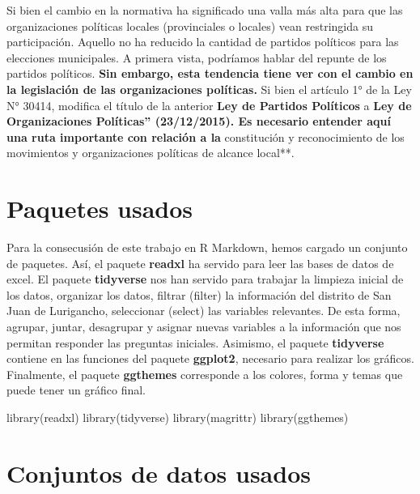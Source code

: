 \documentclass[
]{book}
\newenvironment{Shaded}{\begin{snugshade}}{\end{snugshade}}
\newcommand{\FunctionTok}[1]{\textcolor[rgb]{0.00,0.00,0.00}{#1}}
\newcommand{\NormalTok}[1]{#1}
\begin{document}
Si bien el cambio en la normativa ha significado una valla más alta para que las organizaciones políticas locales (provinciales o locales) vean restringida su participación. Aquello no ha reducido la cantidad de partidos políticos para las elecciones municipales. A primera vista, podríamos hablar del repunte de los partidos políticos. \textbf{Sin embargo, esta tendencia tiene ver con el cambio en la legislación de las organizaciones políticas.} Si bien el artículo 1° de la Ley N° 30414, modifica el título de la anterior \textbf{Ley de Partidos Políticos} a \textbf{Ley de Organizaciones Políticas'' (23/12/2015). Es necesario entender aquí una ruta importante con relación a la }constitución y reconocimiento de los movimientos
y organizaciones políticas de alcance local**.

\hypertarget{paquetes-usados-2}{%
\section{Paquetes usados}\label{paquetes-usados-2}}

Para la consecusión de este trabajo en R Markdown, hemos cargado un conjunto de paquetes. Así, el paquete \textbf{readxl} ha servido para leer las bases de datos de excel. El paquete \textbf{tidyverse} nos han servido para trabajar la limpieza inicial de los datos, organizar los datos, filtrar (filter) la información del distrito de San Juan de Lurigancho, seleccionar (select) las variables relevantes. De esta forma, agrupar, juntar, desagrupar y asignar nuevas variables a la información que nos permitan responder las preguntas iniciales. Asimismo, el paquete \textbf{tidyverse} contiene en las funciones del paquete \textbf{ggplot2}, necesario para realizar los gráficos. Finalmente, el paquete \textbf{ggthemes} corresponde a los colores, forma y temas que puede tener un gráfico final.

\begin{Shaded}
\begin{Highlighting}[]
\FunctionTok{library}\NormalTok{(readxl) }
\FunctionTok{library}\NormalTok{(tidyverse)}
\FunctionTok{library}\NormalTok{(magrittr)}
\FunctionTok{library}\NormalTok{(ggthemes)}
\end{Highlighting}
\end{Shaded}

\hypertarget{conjuntos-de-datos-usados-2}{%
\section{Conjuntos de datos usados}\label{conjuntos-de-datos-usados-2}}
\end{document}
